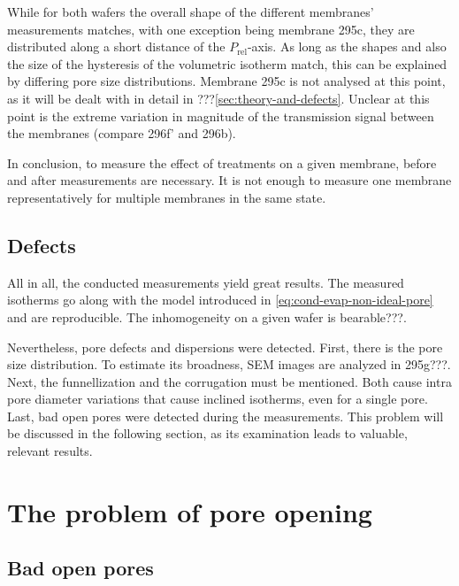 \documentclass[../thesis.tex]{subfiles}
\begin{document}
        While for both wafers the overall shape of the different membranes' measurements matches, with one exception being membrane 295c, they are distributed along a short distance of the $P_\mathrm{rel}$-axis. As long as the shapes and also the size of the hysteresis of the volumetric isotherm match, this can be explained by differing pore size distributions. Membrane 295c is not analysed at this point, as it will be dealt with in detail in ???\cref{sec:theory-and-defects}. Unclear at this point is the extreme variation in magnitude of the transmission signal between the membranes (compare 296f' and 296b).
        \medskip

        In conclusion, to measure the effect of treatments on a given membrane, before and after measurements are necessary. It is not enough to measure one membrane representatively for multiple membranes in the same state.
        


    \subsection{Defects}
    \label{subsec:defects}

        All in all, the conducted measurements yield great results. The measured isotherms go along with the model introduced in \cref{eq:cond-evap-non-ideal-pore} and are reproducible. The inhomogeneity on a given wafer is bearable???.

        Nevertheless, pore defects and dispersions were detected. First, there is the pore size distribution. To estimate its broadness, SEM images are analyzed in 295g???. Next, the funnellization and the corrugation must be mentioned. Both cause intra pore diameter variations that cause inclined isotherms, even for a single pore. Last, bad open pores were detected during the measurements. This problem will be discussed in the following section, as its examination leads to valuable, relevant results.


  \section{The problem of pore opening}
  \label{sec:opening-problem}


      \subsection{Bad open pores}
      \label{subsec:bad-open-pores}
\end{document}
